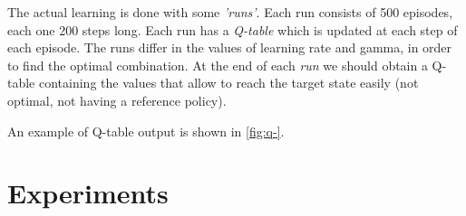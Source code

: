 The actual learning is done with some \textit{'runs'}. Each run consists of 500 episodes, each one 200 steps long. Each run has a \textit{Q-table} which is updated at each step of each episode. The runs differ in the values of learning rate and gamma, in order to find the optimal combination. At the end of each \textit{run} we should obtain a Q-table containing the values that allow to reach the target state easily (not optimal, not having a reference policy).

An example of Q-table output is shown in \ref{fig:q-}.

\section{Experiments}